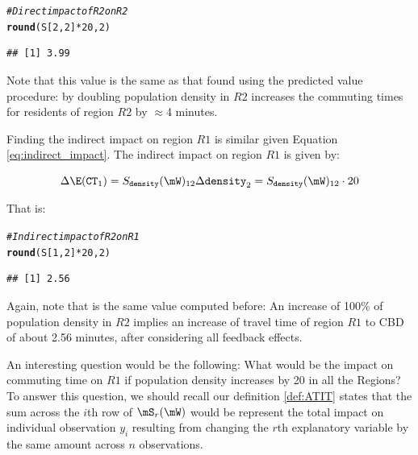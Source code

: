 \documentclass[english,12pt]{book}\usepackage[]{graphicx}\usepackage[]{xcolor}
\makeatletter
\newcommand{\hlnum}[1]{\textcolor[rgb]{0.686,0.059,0.569}{#1}}%
\newcommand{\hlcom}[1]{\textcolor[rgb]{0.678,0.584,0.686}{\textit{#1}}}%
\newcommand{\hlopt}[1]{\textcolor[rgb]{0,0,0}{#1}}%
\newcommand{\hlstd}[1]{\textcolor[rgb]{0.345,0.345,0.345}{#1}}%
\newcommand{\hlkwd}[1]{\textcolor[rgb]{0.737,0.353,0.396}{\textbf{#1}}}%
\newenvironment{kframe}{%
 \def\at@end@of@kframe{}%
 \ifinner\ifhmode%
  \def\at@end@of@kframe{\end{minipage}}%
  \begin{minipage}{\columnwidth}%
 \fi\fi%
 \def\FrameCommand##1{\hskip\@totalleftmargin \hskip-\fboxsep
 \colorbox{shadecolor}{##1}\hskip-\fboxsep
     \hskip-\linewidth \hskip-\@totalleftmargin \hskip\columnwidth}%
 \MakeFramed {\advance\hsize-\width
   \@totalleftmargin\z@ \linewidth\hsize
   \@setminipage}}%
 {\par\unskip\endMakeFramed%
 \at@end@of@kframe}
\newenvironment{knitrout}{}{} %
\makeatother
\begin{document}
\begin{knitrout}
\color{fgcolor}\begin{kframe}
\begin{alltt}
\hlcom{# Direct impact of R2 on R2}
\hlkwd{round}\hlstd{(S[}\hlnum{2}\hlstd{,}\hlnum{2}\hlstd{]} \hlopt{*} \hlnum{20}\hlstd{,} \hlnum{2}\hlstd{)}
\end{alltt}
\begin{verbatim}
## [1] 3.99
\end{verbatim}
\end{kframe}
\end{knitrout}

Note that this value is the same as that found using the predicted value procedure:  by doubling population density in  $R2$  increases the commuting times for residents of region $R2$ by $\approx$4 minutes. 

Finding the indirect impact on region $R1$ is similar given Equation \ref{eq:indirect_impact}. The indirect impact on region $R1$ is given by:

\begin{equation*}
  \Delta \E(\texttt{CT}_1) = S_{\texttt{density}}(\mW)_{12} \Delta \texttt{density}_{2} = S_{\texttt{density}}(\mW)_{12} \cdot 20
\end{equation*}

That is:

\begin{knitrout}
\color{fgcolor}\begin{kframe}
\begin{alltt}
\hlcom{# Indirect impact of R2 on R1}
\hlkwd{round}\hlstd{(S[}\hlnum{1}\hlstd{,}\hlnum{2}\hlstd{]} \hlopt{*} \hlnum{20}\hlstd{,} \hlnum{2}\hlstd{)}
\end{alltt}
\begin{verbatim}
## [1] 2.56
\end{verbatim}
\end{kframe}
\end{knitrout}

Again, note that is the same value computed before: An increase of 100\% of population density in $R2$ implies an increase of travel time of region $R1$ to CBD of about 2.56 minutes, after considering all feedback effects. 


An interesting question would be the following: What would be the impact on commuting time on $R1$ if population density increases by 20 in all the Regions? To answer this question, we should recall our definition \ref{def:ATIT} states that the sum across the $i$th row of $\mS_{r}(\mW)$ would be represent the total impact on individual observation $y_i$ resulting from changing the $r$th explanatory variable by the same amount across $n$ observations. 
   
\end{document}
